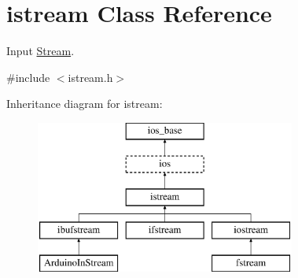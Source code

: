\hypertarget{classistream}{\section{istream Class Reference}
\label{classistream}
}


Input \hyperlink{class_stream}{Stream}.  




{\ttfamily \#include $<$istream.\-h$>$}

Inheritance diagram for istream\-:\begin{figure}[H]
\begin{center}
\leavevmode
\includegraphics[height=5.000000cm]{classistream}
\end{center}
\end{figure}

